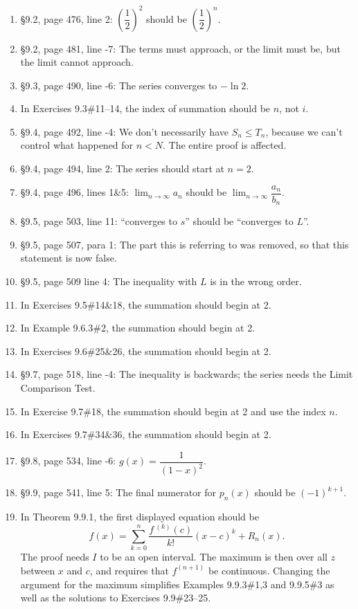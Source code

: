 \documentclass{amsart}
\newcommand{\ds}{\displaystyle}
\begin{document}
\begin{enumerate}
\item \S9.2, page 476, line 2: $\left(\dfrac12\right)^2$ should be $\left(\dfrac12\right)^n$.
\item \S9.2, page 481, line -7: The terms must approach, or the limit must be, but the limit cannot approach.
\item \S9.3, page 490, line -6: The series converges to $-\ln 2$.
\item In Exercises 9.3\#11--14, the index of summation should be $n$, not $i$.
\item \S9.4, page 492, line -4: We don't necessarily have $S_n\le T_n$, because we can't control what happened for $n<N$.  The entire proof is affected.
\item \S9.4, page 494, line 2: The series should start at $n=2$.
\item \S9.4, page 496, lines 1\&5: $\ds\lim_{n\to\infty}a_n$ should be $\ds\lim_{n\to\infty}\dfrac{a_n}{b_n}$.
\item \S9.5, page 503, line 11: ``converges to $s$'' should be ``converges to $L$''.
\item \S9.5, page 507, para 1: The part this is referring to was removed, so that this statement is now false.
\item \S9.5, page 509 line 4: The inequality with $L$ is in the wrong order.
\item In Exercises 9.5\#14\&18, the summation should begin at 2.
\item In Example 9.6.3\#2, the summation should begin at 2.
\item In Exercises 9.6\#25\&26, the summation should begin at 2.
\item \S9.7, page 518, line -4: The inequality is backwards; the series needs the Limit Comparison Test.
\item In Exercise 9.7\#18, the summation should begin at 2 and use the index $n$.
\item In Exercises 9.7\#34\&36, the summation should begin at 2.
\item \S9.8, page 534, line -6: $g(x)=\dfrac1{(1-x)^2}$.
\item \S9.9, page 541, line 5: The final numerator for $p_n(x)$ should be $(-1)^{k+1}$.
\item In Theorem 9.9.1, the first displayed equation should be
\[f(x) = \sum_{k=0}^n\frac{f\,^{(k)}(c)}{k!}(x-c)^k+R_n(x).\]
The proof needs $I$ to be an open interval.  The maximum is then over all $z$ between $x$ and $c$, and requires that $f^{(n+1)}$ be continuous.  Changing the argument for the maximum simplifies Examples 9.9.3\#1,3 and 9.9.5\#3 as well as the solutions to Exercises 9.9\#23--25.

\end{enumerate}
\end{document}
